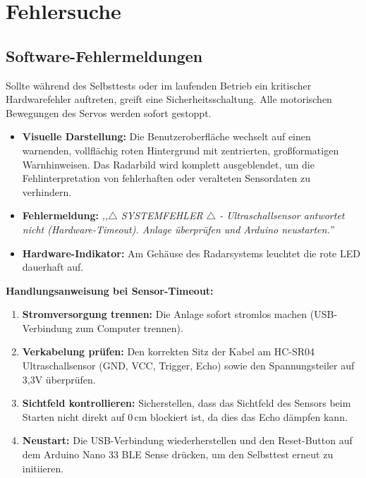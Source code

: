 %
%

\chapter{Fehlersuche}
\section{Software-Fehlermeldungen}
Sollte während des Selbsttests oder im laufenden Betrieb ein kritischer Hardwarefehler auftreten, greift eine Sicherheitsschaltung. Alle motorischen Bewegungen des Servos werden sofort gestoppt.

\begin{itemize}
	\item \textbf{Visuelle Darstellung:} Die Benutzeroberfläche wechselt auf einen warnenden, vollflächig roten Hintergrund mit zentrierten, großformatigen Warnhinweisen. Das Radarbild wird komplett ausgeblendet, um die Fehlinterpretation von fehlerhaften oder veralteten Sensordaten zu verhindern.
	\item \textbf{Fehlermeldung:} \textit{,,$\triangle$ SYSTEMFEHLER $\triangle$ - Ultraschallsensor antwortet nicht (Hardware-Timeout). Anlage überprüfen und Arduino neustarten.''}
	\item \textbf{Hardware-Indikator:} Am Gehäuse des Radarsystems leuchtet die rote LED dauerhaft auf.
\end{itemize}

\vspace{0.5cm}
\noindent \textbf{Handlungsanweisung bei Sensor-Timeout:}
\begin{enumerate}
	\item \textbf{Stromversorgung trennen:} Die Anlage sofort stromlos machen (USB-Verbindung zum Computer trennen).
	\item \textbf{Verkabelung prüfen:} Den korrekten Sitz der Kabel am HC-SR04 Ultraschallsensor (GND, VCC, Trigger, Echo) sowie den Spannungsteiler auf 3,3V überprüfen.
	\item \textbf{Sichtfeld kontrollieren:} Sicherstellen, dass das Sichtfeld des Sensors beim Starten nicht direkt auf 0\,cm blockiert ist, da dies das Echo dämpfen kann.
	\item \textbf{Neustart:} Die USB-Verbindung wiederherstellen und den Reset-Button auf dem Arduino Nano 33 BLE Sense drücken, um den Selbsttest erneut zu initiieren.
\end{enumerate}






